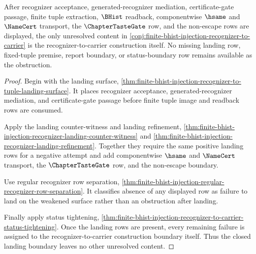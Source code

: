 \begin{theorem}
\label{thm:finite-bhist-injection-recognizer-closed-boundary}
After recognizer acceptance, generated-recognizer mediation, certificate-gate passage, finite tuple extraction, $\BHist$ readback, componentwise $\hsame$ and $\NameCert$ transport, the $\ChapterTasteGate$ row, and the non-escape rows are displayed, the only unresolved content in \autoref{conj:finite-bhist-injection-recognizer-to-carrier} is the recognizer-to-carrier construction itself. No missing landing row, fixed-tuple premise, report boundary, or status-boundary row remains available as the obstruction.
\end{theorem}
\begin{proof}
Begin with the landing surface, \autoref{thm:finite-bhist-injection-recognizer-to-tuple-landing-surface}. It places recognizer acceptance, generated-recognizer mediation, and certificate-gate passage before finite tuple image and readback rows are consumed.

Apply the landing counter-witness and landing refinement, \autoref{thm:finite-bhist-injection-recognizer-landing-counter-witness} and \autoref{thm:finite-bhist-injection-recognizer-landing-refinement}. Together they require the same positive landing rows for a negative attempt and add componentwise $\hsame$ and $\NameCert$ transport, the $\ChapterTasteGate$ row, and the non-escape boundary.

Use regular recognizer row separation, \autoref{thm:finite-bhist-injection-regular-recognizer-row-separation}. It classifies absence of any displayed row as failure to land on the weakened surface rather than an obstruction after landing.

Finally apply status tightening, \autoref{thm:finite-bhist-injection-recognizer-to-carrier-status-tightening}. Once the landing rows are present, every remaining failure is assigned to the recognizer-to-carrier construction boundary itself. Thus the closed landing boundary leaves no other unresolved content.
\end{proof}

